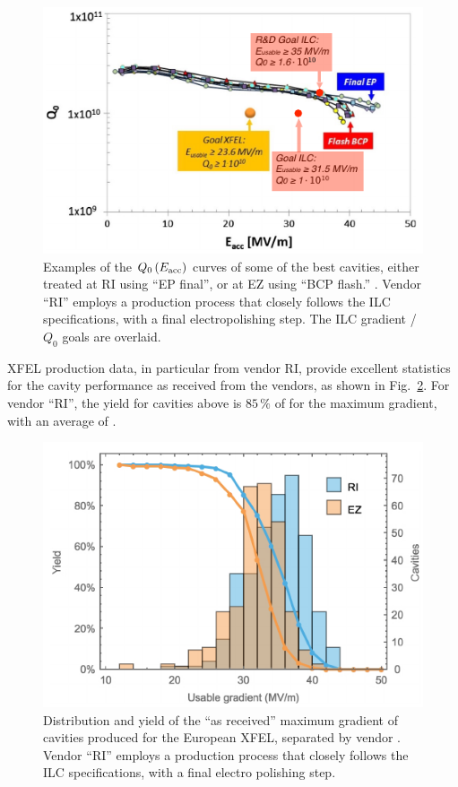 \begin{figure}[htbp]
   \includegraphics[width=\hsize]{chapters/figures/prab-19-092001-fig19-mod}
\caption{Examples of the $Q_0\,(E_{\mathrm{acc}})$ curves of some of the best
cavities, either treated at RI using ``EP final'', or at EZ using
``BCP flash.''
\cite[Fig. 19]{Singer:2016fbf}. 
Vendor ``RI'' employs a production process that closely follows the ILC specifications, with a final electropolishing step.
The ILC gradient / $Q_0$ goals are overlaid.}
\label{fig:cavity-gradient}
\end{figure}

XFEL production data, in particular from vendor RI, provide excellent statistics for the cavity performance as received from the vendors, as shown in Fig.~\ref{fig:cavity-yield}.
For vendor ``RI'', the yield for cavities above  is $85\,\%$ of for the maximum gradient, with an average of .

\begin{figure}[htbp]
   \includegraphics[width=\hsize]{chapters/figures/prab-20-042004-fig33}
\caption{Distribution and yield of the ``as received'' maximum
gradient of cavities produced for the European XFEL, separated by vendor \cite[Fig. 33]{Reschke:2017gjp}. 
Vendor ``RI'' employs a production process that closely follows the ILC specifications, with a final electro polishing step.}
\label{fig:cavity-yield}
\end{figure}

